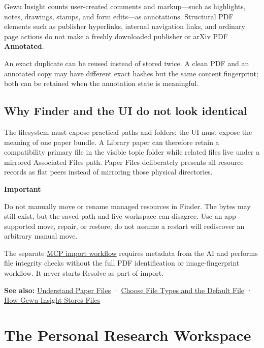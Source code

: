 \documentclass[10pt,letterpaper,oneside]{scrreprt}
\newenvironment{GewuRelated}{\par\nobreak\vspace{3pt}\nobreak\begingroup\small\sffamily\begin{samepage}\noindent}{\par\end{samepage}\endgroup}
\renewenvironment{quote}
  {\Needspace{5\baselineskip}\begin{tcolorbox}[enhanced,breakable,colback=GewuPale,colframe=GewuPale,boxrule=0pt,
    borderline west={1.6pt}{0pt}{GewuBlue},arc=1.2mm,left=2.5mm,right=2.5mm,top=1.7mm,bottom=1.7mm,
    before skip=4pt,after skip=5pt,fontupper=\color{GewuInk}\small]}
  {\end{tcolorbox}}
\begin{document}
Gewu Insight counts user-created comments and markup---such as highlights, notes, drawings, stamps, and form edits---as annotations. Structural PDF elements such as publisher hyperlinks, internal navigation links, and ordinary page actions do not make a freshly downloaded publisher or arXiv PDF \textbf{Annotated}.

An exact duplicate can be reused instead of stored twice. A clean PDF and an annotated copy may have different exact hashes but the same content fingerprint; both can be retained when the annotation state is meaningful.

\section{Why Finder and the UI do not look identical}\label{why-finder-and-the-ui-do-not-look-identical}

The filesystem must expose practical paths and folders; the UI must expose the meaning of one paper bundle. A Library paper can therefore retain a compatibility primary file in the visible topic folder while related files live under a mirrored Associated Files path. Paper Files deliberately presents all resource records as flat peers instead of mirroring those physical directories.

\begin{quote}
\textbf{Important}

Do not manually move or rename managed resources in Finder. The bytes may still exist, but the saved path and live workspace can disagree. Use an app-supported move, repair, or restore; do not assume a restart will rediscover an arbitrary manual move.
\end{quote}

The separate \hyperref[ai-access]{MCP import workflow} requires metadata from the AI and performs file integrity checks without the full PDF identification or image-fingerprint workflow. It never starts Resolve as part of import.

\begin{GewuRelated}
\textbf{See also:} \hyperref[paper-files]{Understand Paper Files} · \hyperref[versions-current]{Choose File Types and the Default File} · \hyperref[storage-model]{How Gewu Insight Stores Files}
\end{GewuRelated}

\chapter{The Personal Research Workspace}\label{personal-research-workspace}
\end{document}
